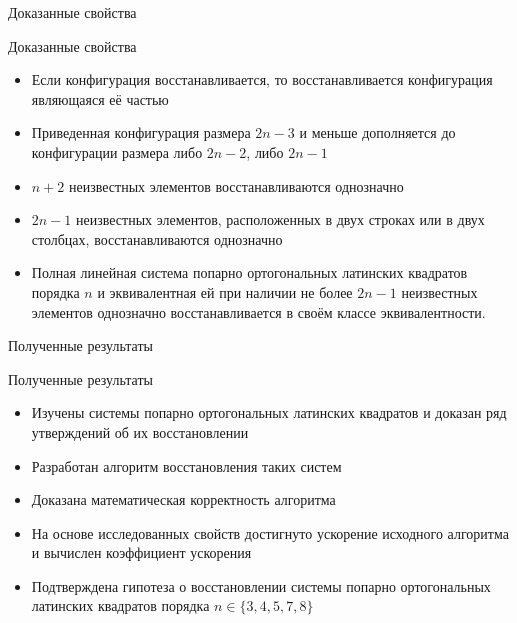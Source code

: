 \documentclass[8pt, hyperref={pdftex,unicode}]{beamer}
\begin{document}
\begin{frame}{Доказанные свойства}

    \begin{block}{Доказанные свойства}
        \begin{itemize}
            \item Если конфигурация восстанавливается, то восстанавливается конфигурация являющаяся её частью
            \item Приведенная конфигурация размера $2n-3$ и меньше дополняется до конфигурации размера либо $2n-2$, либо $2n-1$
            \item $n+2$ неизвестных элементов восстанавливаются однозначно
            \item $2n-1$ неизвестных элементов, расположенных в двух строках или в двух столбцах, восстанавливаются однозначно
            \item Полная линейная система попарно ортогональных латинских квадратов порядка $n$ и эквивалентная ей при наличии не более $2n - 1$ неизвестных элементов однозначно восстанавливается в своём классе эквивалентности.
        \end{itemize}
    \end{block}

\end{frame}


\begin{frame}{Полученные результаты}

    \begin{block}{Полученные результаты}
        \begin{itemize}
            \item Изучены системы попарно ортогональных латинских квадратов и доказан ряд утверждений об их восстановлении
            \item Разработан алгоритм восстановления таких систем
            \item Доказана математическая корректность алгоритма
            \item На основе исследованных свойств достигнуто ускорение исходного алгоритма и вычислен коэффициент ускорения
            \item Подтверждена гипотеза о восстановлении системы попарно ортогональных латинских квадратов порядка $n\in\{3,4,5,7,8\}$
        \end{itemize}
    \end{block}

\end{frame}
\end{document}
